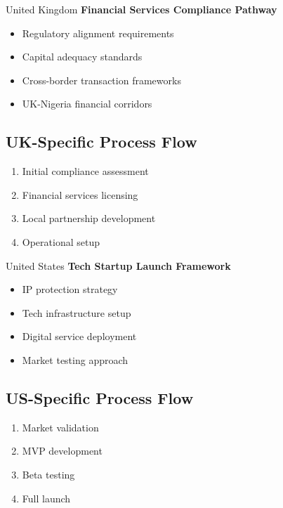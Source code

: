 \begin{regionalbox}{United Kingdom}
\textbf{Financial Services Compliance Pathway}
\begin{itemize}
    \item Regulatory alignment requirements
    \item Capital adequacy standards
    \item Cross-border transaction frameworks
    \item UK-Nigeria financial corridors
\end{itemize}

\subsection{UK-Specific Process Flow}
\begin{enumerate}
    \item Initial compliance assessment
    \item Financial services licensing
    \item Local partnership development
    \item Operational setup
\end{enumerate}
\end{regionalbox}

\begin{regionalbox}{United States}
\textbf{Tech Startup Launch Framework}
\begin{itemize}
    \item IP protection strategy
    \item Tech infrastructure setup
    \item Digital service deployment
    \item Market testing approach
\end{itemize}

\subsection{US-Specific Process Flow}
\begin{enumerate}
    \item Market validation
    \item MVP development
    \item Beta testing
    \item Full launch
\end{enumerate}
\end{regionalbox}

